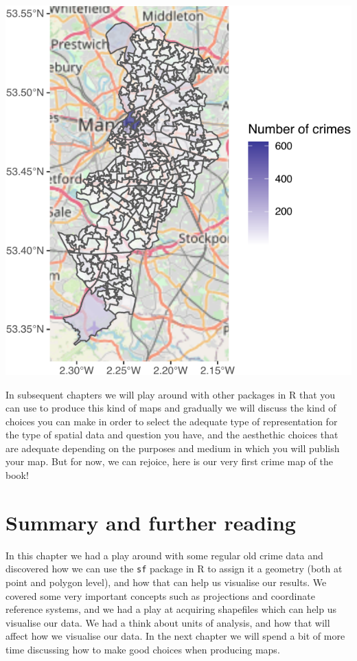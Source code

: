 \documentclass[
]{book}
\begin{document}
\includegraphics{crime_mapping_files/figure-latex/unnamed-chunk-31-1.pdf}

In subsequent chapters we will play around with other packages in R that you can use to produce this kind of maps and gradually we will discuss the kind of choices you can make in order to select the adequate type of representation for the type of spatial data and question you have, and the aesthethic choices that are adequate depending on the purposes and medium in which you will publish your map. But for now, we can rejoice, here is our very first crime map of the book!

\hypertarget{summary-and-further-reading}{%
\section{Summary and further reading}\label{summary-and-further-reading}}

In this chapter we had a play around with some regular old crime data and discovered how we can use the \texttt{sf} package in R to assign it a geometry (both at point and polygon level), and how that can help us visualise our results. We covered some very important concepts such as projections and coordinate reference systems, and we had a play at acquiring shapefiles which can help us visualise our data. We had a think about units of analysis, and how that will affect how we visualise our data. In the next chapter we will spend a bit of more time discussing how to make good choices when producing maps.
\end{document}
